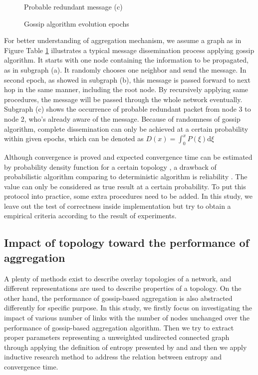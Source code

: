 \begin{figure}[!h]
\begin{center}
\begin{minipage}[c]{0.45\textwidth}
      Probable redundant message (c)
   	\end{minipage}
   \end{center}
   \caption{Gossip algorithm evolution epochs}
   \label{fig:epochs}
\end{figure}

For better understanding of aggregation mechanism, we assume a graph as in Figure 
Table \ref{fig:epochs} illustrates a typical message dissemination process applying gossip algorithm. It starts with one node containing the information to be propagated, as in subgraph (a). It randomly chooses one neighbor and send the message. In second epoch, as showed in subgraph (b), this message is passed forward to next hop in the same manner, including the root node. By recursively applying same procedures, the message will be passed through the whole network eventually. Subgraph (c) shows the occurrence of probable redundant packet from node 3 to node 2, who's already aware of the message. Because of randomness of gossip algorithm, complete dissemination can only be achieved at a certain probability within given epochs, which can be denoted as $D(x)=\int_0^x P(\xi)\mathrm{d}\xi$

Although convergence is proved and expected convergence time can be estimated by probability density function for a certain topology \cite{5929538}, a drawback of probabilistic algorithm comparing to deterministic algorithm is reliability \cite{Lynch:1996:DA:525656}. The value can only be considered as true result at a certain probability. To put this protocol into practice, some extra procedures need to be added. In this study, we leave out the test of correctness inside implementation but try to obtain a empirical criteria according to the result of experiments.\\

\subsection{Impact of topology toward the performance of aggregation}
A plenty of methods exist to describe overlay topologies of a network, and different representations are used to describe properties of a topology. On the other hand, the performance of gossip-based aggregation is also abstracted differently for specific purpose.
In this study, we firstly focus on investigating the impact of various number of links with the number of nodes unchanged over the performance of gossip-based aggregation algorithm. Then we try to extract proper parameters representing a unweighted undirected connected graph through applying the definition of entropy presented by \cite{entropy1} and \cite{entropy2} and then we apply inductive research method \cite{portal} to address the relation between entropy and convergence time.



